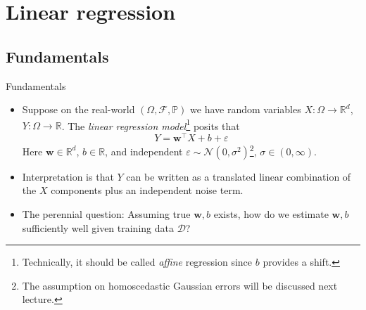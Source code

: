 \documentclass{beamer}
\numberwithin{equation}{section}
\begin{document}
\section{Linear regression}

\subsection{Fundamentals}

\begin{frame}{Fundamentals}
    \begin{itemize}
        \item
        Suppose on the real-world $ (\Omega, \mathcal{F}, \mathbb{P}) $ we
        have random variables $ X : \Omega \rightarrow \mathbb{R}^d $,
        $ Y : \Omega \rightarrow \mathbb{R} $. The \textit{linear regression
        model}\footnote{
            Technically, it should be called \textit{affine} regression since
            $ b $ provides a shift.
        } posits that
        \begin{equation*}
            Y = \mathbf{w}^\top X + b + \varepsilon
        \end{equation*}
        Here $ \mathbf{w} \in \mathbb{R}^d $, $ b \in \mathbb{R} $, and
        independent $ \varepsilon \sim \mathcal{N}(0, \sigma^2) $\footnote{
            The assumption on homoscedastic Gaussian errors will be discussed
            next lecture.
        }, $ \sigma \in (0, \infty) $.

        \item
        Interpretation is that $ Y $ can be written as a translated linear
        combination of the $ X $ components plus an independent noise term.

        \item
        The perennial question: Assuming true $ \mathbf{w}, b $ exists, how do
        we estimate $ \mathbf{w}, b $ sufficiently well given training data
        $ \mathcal{D} $?
    \end{itemize}
\end{frame}
\end{document}

